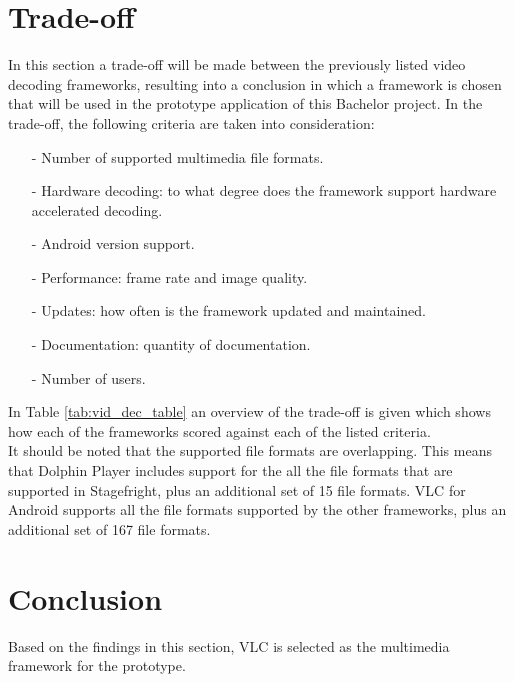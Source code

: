 \section{Trade-off}
In this section a trade-off will be made between the previously listed video decoding frameworks, resulting into a conclusion in which a framework is chosen that will be used in the prototype application of this Bachelor project. In the trade-off, the following criteria are taken into consideration:
\begin{itemize}
	\item[-]Number of supported multimedia file formats.
	\item[-]Hardware decoding: to what degree does the framework support hardware accelerated decoding. 
	\item[-]Android version support.
	\item[-]Performance: frame rate and image quality.
	\item[-]Updates: how often is the framework updated and maintained.
	\item[-]Documentation: quantity of documentation. 
	\item[-]Number of users.
\end{itemize}
In Table \ref{tab:vid_dec_table} an overview of the trade-off is given which shows how each of the frameworks scored against each of the listed criteria.\\
It should be noted that the supported file formats are overlapping. This means that Dolphin Player includes support for the all the file formats that are supported in Stagefright, plus an additional set of 15 file formats. VLC for Android supports all the file formats supported by the other frameworks, plus an additional set of 167 file formats.\\

\section{Conclusion}
Based on the findings in this section, VLC is selected as the multimedia framework for the prototype.


